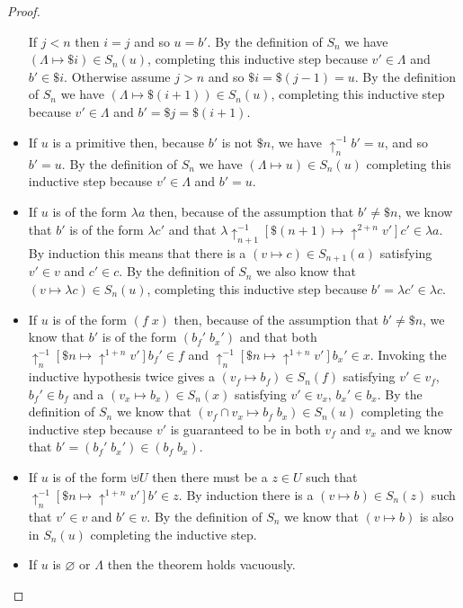 \documentclass{article}
\newcommand{\shift}[1]{\uparrow^{#1}}
\begin{document}
\begin{proof}
\begin{itemize}
    If $j < n$ then
    $i = j$ and so $u = b'$.
    By the definition of $S_n$ we have
    $(\Lambda\mapsto \$i)\in S_n(u)$,
    completing this inductive step because $v'\in \Lambda$ and $b'\in \$i$.
    Otherwise assume $j > n$
    and so $\$i = \$(j - 1) = u$.
    By the definition of $S_n$ we have
    $(\Lambda\mapsto \$(i + 1))\in S_n(u)$,
    completing this inductive step because $v'\in \Lambda$
    and $b' = \$j = \$(i + 1)$.
  \item If $u$ is a primitive then,
    because $b'$ is not $\$n$,
    we have $\shift{-1}_nb' = u$,
    and so $b' = u$.
    By the definition of $S_n$ we have $(\Lambda\mapsto u)\in S_n(u)$
    completing this inductive step because $v'\in \Lambda$ and $b' = u$.
  \item If $u$ is of the form $\lambda a$ then,
    because of the assumption that $b'\not=\$n$,
    we know that $b'$ is of the form $\lambda c'$ 
    and that $\lambda \shift{-1}_{n + 1}[\$(n + 1)\mapsto \shift{2 + n}v']c'\in \lambda a$.
    By induction this means that there is a $(v\mapsto c)\in S_{n + 1}(a)$
    satisfying $v'\in v$ and $c'\in c$.
    By the definition of $S_n$ we also know that
    $(v\mapsto  \lambda c)\in S_n(u)$,
    completing this inductive step because $b' = \lambda c'\in \lambda c$.
  \item If $u$ is of the form $(f\;x)$
    then,
    because of the assumption that $b'\not=\$n$,
    we know that $b'$ is of the form $(b_f'\;b_x')$
    and that both
    $\shift{-1}_n[\$n\mapsto \shift{1 + n}v']b_f'\in f$ and $\shift{-1}_n[\$n\mapsto \shift{1 + n}v']b_x'\in x$.
    Invoking the inductive hypothesis twice
    gives a
    $(v_f\mapsto b_f)\in S_n(f)$ satisfying $v'\in v_f$, $b_f'\in b_f$
    and a
    $(v_x\mapsto b_x)\in S_n(x)$ satisfying $v'\in v_x$, $b_x'\in b_x$.
    By the definition of $S_n$
    we know that $(v_f\cap v_x\mapsto b_f\;b_x)\in S_n(u)$
    completing the inductive step because $v'$ is guaranteed to be
    in both $v_f$ and $v_x$ and we know that
    $b' = (b_f'\;b_x')\in (b_f\;b_x)$.

  \item If $u$ is of the form $\uplus U$
    then there must be a $z\in U$ such that $\shift{-1}_n[\$n\mapsto \shift{1 + n}v']b'\in z$.
    By induction there is a $(v\mapsto b)\in S_n(z)$ such that $v'\in v$ and $b'\in v$.
    By the definition of $S_n$ we know that $(v\mapsto b)$ is also in $S_n(u)$ completing the inductive step.
  \item If $u$  is $\varnothing $ or $\Lambda$ then the theorem holds vacuously.    
    \end{itemize}
\end{proof}
\end{document}
